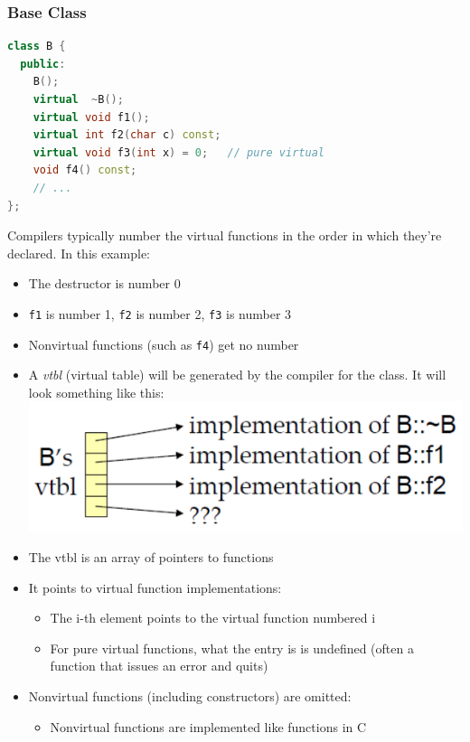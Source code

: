 \subsubsection{Base Class}
\begin{lstlisting}[language=C++]
class B {
  public:
    B();
    virtual  ~B();
    virtual void f1();
    virtual int f2(char c) const;
    virtual void f3(int x) = 0;   // pure virtual
    void f4() const;
    // ...
};
\end{lstlisting}
Compilers typically number the virtual functions in the order in which they're declared. In this example:
\begin{itemize}
  \item The destructor is number 0
  \item \lstinline{f1} is number 1, \lstinline{f2} is number 2, \lstinline{f3} is number 3
  \item Nonvirtual functions (such as \lstinline{f4}) get no number
\end{itemize}

\begin{itemize}
  \item A \textit{vtbl} (virtual table) will be generated by the compiler for the class. It will look something like this:
  \includegraphics[width=0.5\linewidth]{images/AdvancedCPP/vtbl}
  \item The vtbl is an array of pointers to functions
  \item It points to virtual function implementations:
  \begin{itemize}
    \item The i-th element points to the virtual function numbered i
    \item For pure virtual functions, what the entry is is undefined (often a function that issues an error and quits)
  \end{itemize}
  \item Nonvirtual functions (including constructors) are omitted:
  \begin{itemize}
    \item Nonvirtual functions are implemented like functions in C
  \end{itemize}
\end{itemize}

